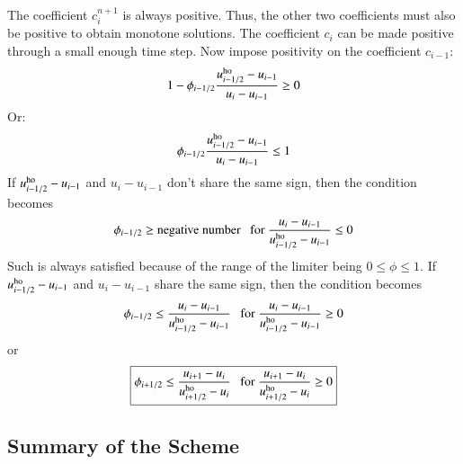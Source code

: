 \documentclass{warpdoc}
\newcommand\frameeqn[1]{\fbox{$\displaystyle #1$}}
\begin{document}
%
The coefficient $c_i^{n+1}$ is always positive. Thus, the other two coefficients must also be positive to obtain monotone solutions. The coefficient $c_i$ can be made positive through a small enough time step. Now impose positivity on the coefficient $c_{i-1}$:
%
\begin{equation}
1 -\phi_{i-1/2} \frac{u_{i-1/2}^{\rm ho} - u_{i-1}}{u_{i} - u_{i-1}}\ge 0
\end{equation}
%
Or:
%
\begin{equation}
 \phi_{i-1/2} \frac{u_{i-1/2}^{\rm ho} - u_{i-1}}{u_{i} - u_{i-1}}\le 1
\end{equation}
%
If $u_{i-1/2}^{\rm ho} - u_{i-1}$ and $u_{i} - u_{i-1}$ don't share the same sign, then the condition becomes
%
\begin{equation}
 \phi_{i-1/2} \ge \textrm{negative number} ~~~{\rm for~}\frac{u_{i} - u_{i-1}}{u_{i-1/2}^{\rm ho} - u_{i-1}}\le 0
\end{equation}
%
Such is always satisfied because of the range of the limiter being $0 \le \phi \le 1$. If $u_{i-1/2}^{\rm ho} - u_{i-1}$ and $u_{i} - u_{i-1}$ share the same sign, then the condition becomes
%
\begin{equation}
 \phi_{i-1/2} \le \frac{u_{i} - u_{i-1}}{u_{i-1/2}^{\rm ho} - u_{i-1}} ~~~{\rm for~}\frac{u_{i} - u_{i-1}}{u_{i-1/2}^{\rm ho} - u_{i-1}}\ge 0
\end{equation}
%
or
%
\begin{equation}
\frameeqn{
 \phi_{i+1/2} \le \frac{u_{i+1} - u_{i}}{u_{i+1/2}^{\rm ho} - u_{i}} ~~~{\rm for~}\frac{u_{i+1} - u_{i}}{u_{i+1/2}^{\rm ho} - u_{i}}\ge 0
}
\label{eqn:positive_condition_ho}
\end{equation}
%





\subsection{Summary of the Scheme}
\end{document}
